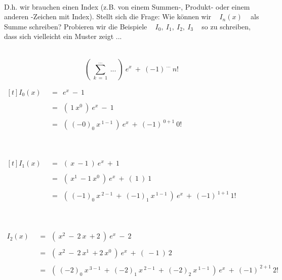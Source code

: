 	~\\
	
	D.h. wir brauchen einen Index (z.B. von einem Summen-, Produkt- oder einem anderen -Zeichen mit Index). Stellt sich die Frage: Wie können wir ~ $I_n(x)$ ~ als Summe schreiben? Probieren wir die Beispiele ~ $I_0, ~ I_1, ~ I_2, ~ I_3$ ~ so zu schreiben, dass sich vielleicht ein Muster zeigt ...
	
	~\\
	
	\[ \left( ~ \sum_{k ~ = ~ 1}^{...} ~ ... ~ \right) ~ e^x ~ + ~ (-1)^{~ ...} ~ n! \]
	
	
	\newpage	

	$\begin{aligned}[t]
	I_0(x) ~~ &= ~~ e^x ~ - ~ 1 \\ \\
	&= ~~ \left( ~ 1 ~ x^0 ~ \right) ~ e^x ~ - ~ 1 \\ \\
	&= ~~ \left( ~ (-0)_0 ~ x^{~ 1 - 1} ~ \right) ~ e^x ~ + ~ \left( -1 \right)^{~ 0 + 1} ~ 0!
	\end{aligned}$
	
	~\\~\\
	
	$\begin{aligned}[t]
	I_1(x) ~~ &= ~~ \left( ~ x ~ - 1 ~ \right) ~ e^x ~ + ~ 1 \\ \\
	&= ~~ \left( ~ x^1 ~ - 1 ~ x^0 ~ \right) ~ e^x ~ + ~ \left( ~ 1 ~ \right) ~ 1 \\ \\
	&= ~~ \left( ~ (-1)_0 ~ x^{~ 2 - 1} ~ + ~ (-1)_1 ~ x^{~ 1 - 1} ~ \right) ~ e^x ~ + ~ \left( -1 \right)^{~ 1 + 1} ~ 1!
	\end{aligned}$
	
	~\\~\\
	
	$\begin{aligned}
	I_2(x) ~~ &= ~~ \left( ~ x^2 ~ - ~ 2 ~ x ~ + 2 ~ \right) ~ e^x ~ - ~ 2 \\ \\
	&= ~~ \left( ~ x^2 ~ - ~ 2 ~ x^1 ~ + 2 ~ x^0 ~ \right) ~ e^x ~ + ~ \left( ~ -1 ~ \right) ~ 2 \\ \\
	&= ~~ \left( ~ (-2)_0 ~ x^{~ 3 - 1} ~ + ~ (-2)_1 ~ x^{~ 2 - 1} ~ + ~ (-2)_2 ~ x^{~ 1 - 1} ~ \right) ~ e^x ~ + ~ \left( -1 \right)^{~ 2 + 1} ~ 2!
	\end{aligned}$
	
